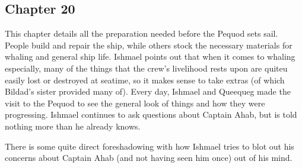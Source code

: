 \subsection{Chapter 20}

This chapter details all the preparation needed before the Pequod sets sail.
People build and repair the ship, while others stock the necessary materials
for whaling and general ship life. Ishmael points out that when it comes to
whaling especially, many of the things that the crew's livelihood rests upon
are quiteu easily lost or destroyed at seatime, so it makes sense to take
extras (of which Bildad's sister provided many of). Every day, Ishmael and
Queequeg made the visit to the Pequod to see the general look of things and how
they were progressing. Ishmael continues to ask questions about Captain Ahab,
but is told nothing more than he already knows.

There is some quite direct foreshadowing with how Ishmael tries to blot out his
concerns about Captain Ahab (and not having seen him once) out of his mind.
